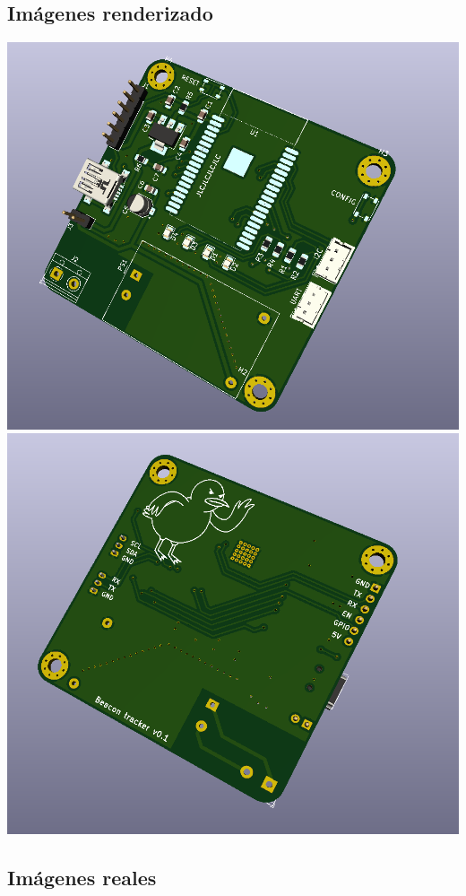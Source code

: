 \documentclass[a4paper ,12pt, onecolumn]{article}
\begin{document}
    \subsection{Imágenes renderizado}   
        \includegraphics[scale=0.4]{../receiver_1.PNG}
        \includegraphics[scale=0.4]{../receiver_2.PNG}
    \subsection{Imágenes reales}
\end{document}
